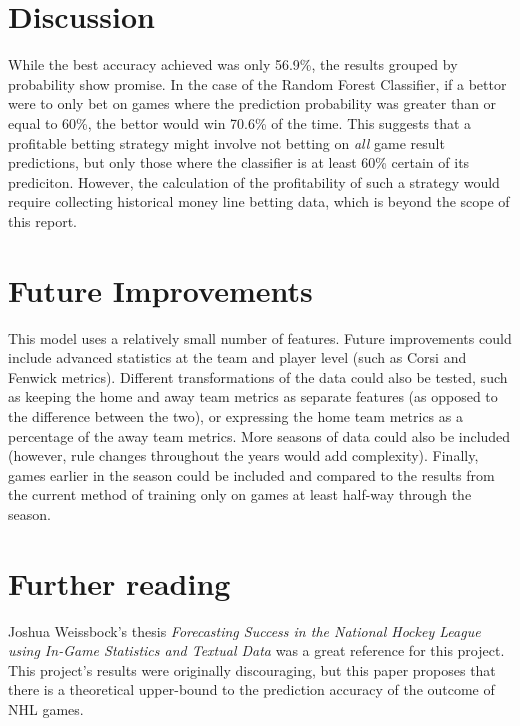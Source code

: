 \documentclass[letterpaper, 10 pt, conference]{ieeeconf}
\begin{document}
\section{Discussion}

While the best accuracy achieved was only 56.9\%, the results grouped by probability show promise. In the case of the Random Forest Classifier, if a bettor were to only bet on games where the prediction probability was greater than or equal to 60\%, the bettor would win 70.6\% of the time. This suggests that a profitable betting strategy might involve not betting on \textit{all} game result predictions, but only those where the classifier is at least 60\% certain of its prediciton. However, the calculation of the profitability of such a strategy would require collecting historical money line betting data, which is beyond the scope of this report.

\section{Future Improvements}

This model uses a relatively small number of features. Future improvements could include advanced statistics at the team and player level (such as Corsi and Fenwick metrics). Different transformations of the data could also be tested, such as keeping the home and away team metrics as separate features (as opposed to the difference between the two), or expressing the home team metrics as a percentage of the away team metrics. More seasons of data could also be included (however, rule changes throughout the years would add complexity). Finally, games earlier in the season could be included and compared to the results from the current method of training only on games at least half-way through the season.

\section*{Further reading}

Joshua Weissbock's thesis \textit{Forecasting Success in the National Hockey League using In-Game Statistics and Textual Data} was a great reference for this project. This project's results were originally discouraging, but this paper proposes that there is a theoretical upper-bound to the prediction accuracy of the outcome of NHL games.
\end{document}
